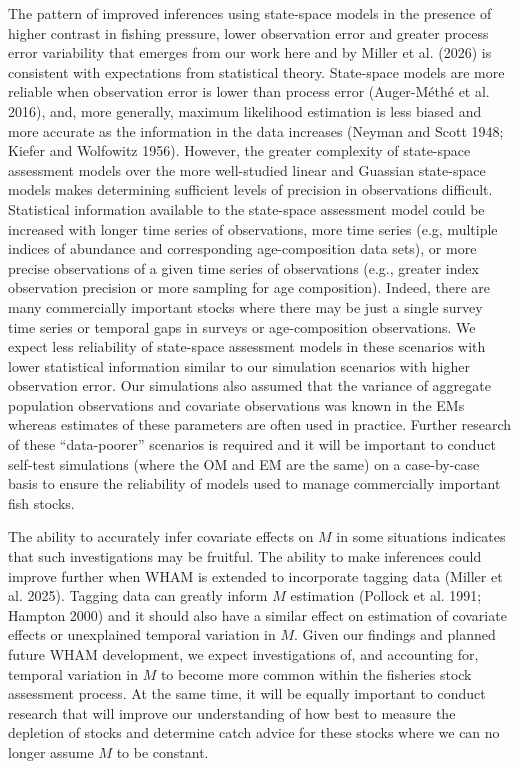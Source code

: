 \documentclass[
  12pt,
]{article}
\begin{document}
The pattern of improved inferences using state-space models in the
presence of higher contrast in fishing pressure, lower observation error
and greater process error variability that emerges from our work here
and by Miller et al. (2026) is consistent with expectations from
statistical theory. State-space models are more reliable when
observation error is lower than process error (Auger-Méthé et al. 2016),
and, more generally, maximum likelihood estimation is less biased and
more accurate as the information in the data increases (Neyman and Scott
1948; Kiefer and Wolfowitz 1956). However, the greater complexity of
state-space assessment models over the more well-studied linear and
Guassian state-space models makes determining sufficient levels of
precision in observations difficult. Statistical information available
to the state-space assessment model could be increased with longer time
series of observations, more time series (e.g, multiple indices of
abundance and corresponding age-composition data sets), or more precise
observations of a given time series of observations (e.g., greater index
observation precision or more sampling for age composition). Indeed,
there are many commercially important stocks where there may be just a
single survey time series or temporal gaps in surveys or age-composition
observations. We expect less reliability of state-space assessment
models in these scenarios with lower statistical information similar to
our simulation scenarios with higher observation error. Our simulations
also assumed that the variance of aggregate population observations and
covariate observations was known in the EMs whereas estimates of these
parameters are often used in practice. Further research of these
``data-poorer'' scenarios is required and it will be important to
conduct self-test simulations (where the OM and EM are the same) on a
case-by-case basis to ensure the reliability of models used to manage
commercially important fish stocks.

The ability to accurately infer covariate effects on \(M\) in some
situations indicates that such investigations may be fruitful. The
ability to make inferences could improve further when WHAM is extended
to incorporate tagging data (Miller et al. 2025). Tagging data can
greatly inform \(M\) estimation (Pollock et al. 1991; Hampton 2000) and
it should also have a similar effect on estimation of covariate effects
or unexplained temporal variation in \(M\). Given our findings and
planned future WHAM development, we expect investigations of, and
accounting for, temporal variation in \(M\) to become more common within
the fisheries stock assessment process. At the same time, it will be
equally important to conduct research that will improve our
understanding of how best to measure the depletion of stocks and
determine catch advice for these stocks where we can no longer assume
\(M\) to be constant.
\end{document}
